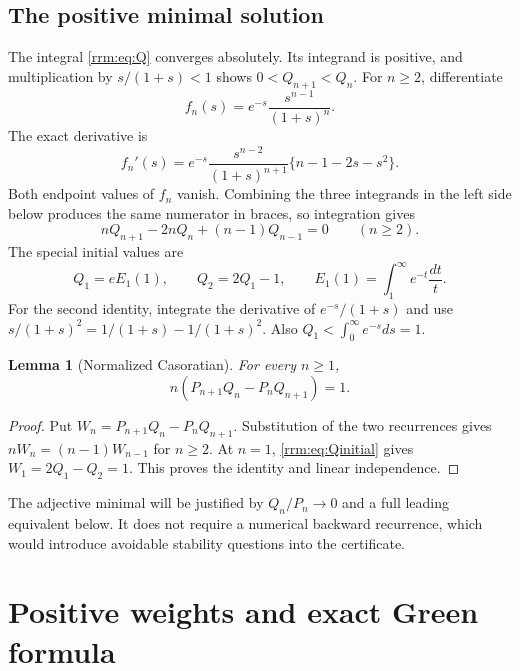 \documentclass[11pt]{article}
\newtheorem{lemma}[theorem]{Lemma}
\theoremstyle{remark}\newtheorem{remark}[theorem]{Remark}
\begin{document}
\subsection{The positive minimal solution}
The integral \eqref{rrm:eq:Q} converges absolutely. Its integrand is positive, and multiplication by $s/(1+s)<1$ shows $0<Q_{n+1}<Q_n$. For $n\ge2$, differentiate
\[
 f_n(s)=e^{-s}\frac{s^{n-1}}{(1+s)^n}.
\]
The exact derivative is
\begin{equation}\label{rrm:eq:derivative}
 f_n'(s)=e^{-s}\frac{s^{n-2}}{(1+s)^{n+1}}
 \{n-1-2s-s^2\}.
\end{equation}
Both endpoint values of $f_n$ vanish. Combining the three integrands in the left side below produces the same numerator in braces, so integration gives
\begin{equation}\label{rrm:eq:recQ}
 nQ_{n+1}-2nQ_n+(n-1)Q_{n-1}=0\qquad(n\ge2).
\end{equation}
The special initial values are
\begin{equation}\label{rrm:eq:Qinitial}
 Q_1=eE_1(1),\qquad Q_2=2Q_1-1,
 \qquad E_1(1)=\int_1^\infty e^{-t}\frac{dt}{t}.
\end{equation}
For the second identity, integrate the derivative of $e^{-s}/(1+s)$ and use
$s/(1+s)^2=1/(1+s)-1/(1+s)^2$. Also $Q_1<\int_0^\infty e^{-s}ds=1$.

\begin{lemma}[Normalized Casoratian]\label{rrm:lem:casoratian}
For every $n\ge1$,
\begin{equation}\label{rrm:eq:casoratian}
 n(P_{n+1}Q_n-P_nQ_{n+1})=1.
\end{equation}
\end{lemma}
\begin{proof}
Put $W_n=P_{n+1}Q_n-P_nQ_{n+1}$. Substitution of the two recurrences gives $nW_n=(n-1)W_{n-1}$ for $n\ge2$. At $n=1$, \eqref{rrm:eq:Qinitial} gives $W_1=2Q_1-Q_2=1$. This proves the identity and linear independence.
\end{proof}

The adjective minimal will be justified by $Q_n/P_n\to0$ and a full leading equivalent below. It does not require a numerical backward recurrence, which would introduce avoidable stability questions into the certificate.

\section{Positive weights and exact Green formula}\label{rrm:sec:green}
\end{document}
